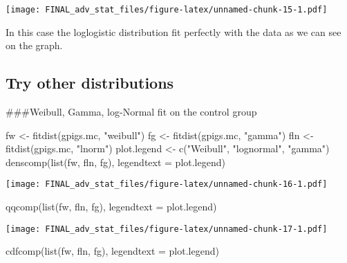 \documentclass[
]{article}
\newenvironment{Shaded}{\begin{snugshade}}{\end{snugshade}}
\newcommand{\AttributeTok}[1]{\textcolor[rgb]{0.77,0.63,0.00}{#1}}
\newcommand{\FunctionTok}[1]{\textcolor[rgb]{0.00,0.00,0.00}{#1}}
\newcommand{\NormalTok}[1]{#1}
\newcommand{\OtherTok}[1]{\textcolor[rgb]{0.56,0.35,0.01}{#1}}
\newcommand{\StringTok}[1]{\textcolor[rgb]{0.31,0.60,0.02}{#1}}
\begin{document}
\texttt{[image: FINAL\_adv\_stat\_files/figure-latex/unnamed-chunk-15-1.pdf]}

In this case the loglogistic distribution fit perfectly with the data as
we can see on the graph.

\hypertarget{try-other-distributions}{%
\subsection{Try other distributions}\label{try-other-distributions}}

\#\#\#Weibull, Gamma, log-Normal fit on the control group

\begin{Shaded}
\begin{Highlighting}[]
\NormalTok{fw }\OtherTok{\textless{}{-}} \FunctionTok{fitdist}\NormalTok{(gpigs.mc, }\StringTok{"weibull"}\NormalTok{)}
\NormalTok{fg }\OtherTok{\textless{}{-}} \FunctionTok{fitdist}\NormalTok{(gpigs.mc, }\StringTok{"gamma"}\NormalTok{) }
\NormalTok{fln }\OtherTok{\textless{}{-}} \FunctionTok{fitdist}\NormalTok{(gpigs.mc, }\StringTok{"lnorm"}\NormalTok{) }
\NormalTok{plot.legend }\OtherTok{\textless{}{-}} \FunctionTok{c}\NormalTok{(}\StringTok{"Weibull"}\NormalTok{, }\StringTok{"lognormal"}\NormalTok{, }\StringTok{"gamma"}\NormalTok{)}
\FunctionTok{denscomp}\NormalTok{(}\FunctionTok{list}\NormalTok{(fw, fln, fg), }\AttributeTok{legendtext =}\NormalTok{ plot.legend) }
\end{Highlighting}
\end{Shaded}

\texttt{[image: FINAL\_adv\_stat\_files/figure-latex/unnamed-chunk-16-1.pdf]}

\begin{Shaded}
\begin{Highlighting}[]
\FunctionTok{qqcomp}\NormalTok{(}\FunctionTok{list}\NormalTok{(fw, fln, fg), }\AttributeTok{legendtext =}\NormalTok{ plot.legend) }
\end{Highlighting}
\end{Shaded}

\texttt{[image: FINAL\_adv\_stat\_files/figure-latex/unnamed-chunk-17-1.pdf]}

\begin{Shaded}
\begin{Highlighting}[]
\FunctionTok{cdfcomp}\NormalTok{(}\FunctionTok{list}\NormalTok{(fw, fln, fg), }\AttributeTok{legendtext =}\NormalTok{ plot.legend) }
\end{Highlighting}
\end{Shaded}
\end{document}
